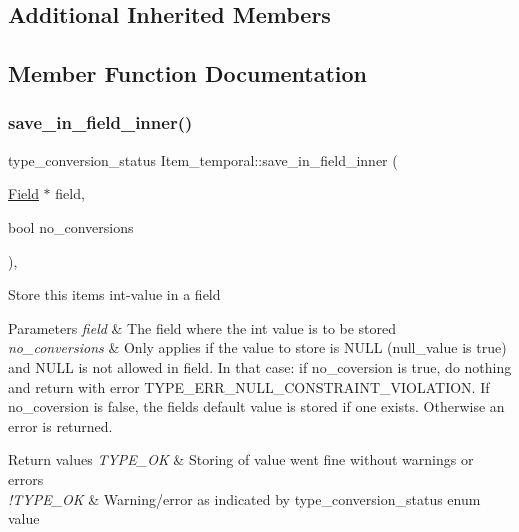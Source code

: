 \subsection*{Additional Inherited Members}


\subsection{Member Function Documentation}
\mbox{\label{classItem__temporal_a12c4888e99d5a236550023180ec4f400}} 
\subsubsection{\texorpdfstring{save\+\_\+in\+\_\+field\+\_\+inner()}{save\_in\_field\_inner()}}
{\footnotesize\ttfamily type\+\_\+conversion\+\_\+status Item\+\_\+temporal\+::save\+\_\+in\+\_\+field\+\_\+inner (\begin{DoxyParamCaption}\item[{\mbox{\hyperlink{classField}{Field}} $\ast$}]{field,  }\item[{bool}]{no\+\_\+conversions }\end{DoxyParamCaption})\hspace{0.3cm}{\ttfamily [protected]}, {\ttfamily [virtual]}}

Store this item\textquotesingle{}s int-\/value in a field


\begin{DoxyParams}{Parameters}
{\em field} & The field where the int value is to be stored \\
\hline
{\em no\+\_\+conversions} & Only applies if the value to store is N\+U\+LL (null\+\_\+value is true) and N\+U\+LL is not allowed in field. In that case\+: if no\+\_\+coversion is true, do nothing and return with error T\+Y\+P\+E\+\_\+\+E\+R\+R\+\_\+\+N\+U\+L\+L\+\_\+\+C\+O\+N\+S\+T\+R\+A\+I\+N\+T\+\_\+\+V\+I\+O\+L\+A\+T\+I\+ON. If no\+\_\+coversion is false, the field\textquotesingle{}s default value is stored if one exists. Otherwise an error is returned.\\
\hline
\end{DoxyParams}

\begin{DoxyRetVals}{Return values}
{\em T\+Y\+P\+E\+\_\+\+OK} & Storing of value went fine without warnings or errors \\
\hline
{\em !\+T\+Y\+P\+E\+\_\+\+OK} & Warning/error as indicated by type\+\_\+conversion\+\_\+status enum value \\
\hline
\end{DoxyRetVals}


